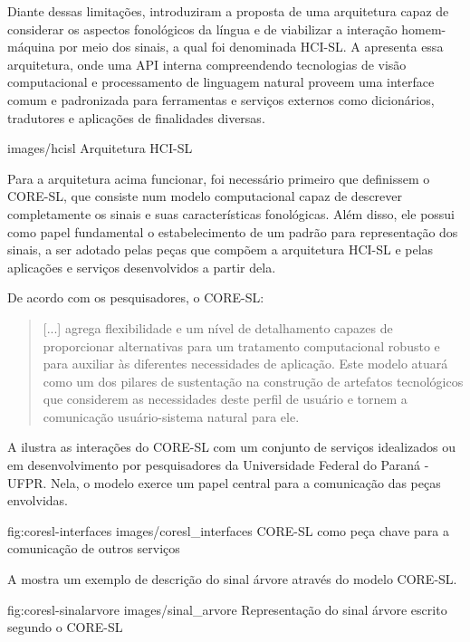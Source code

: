 Diante dessas limitações, \textcite{antunes-hcisl-2011} introduziram a proposta de uma arquitetura capaz de considerar os aspectos fonológicos da língua e de viabilizar a interação homem-máquina por meio dos sinais, a qual foi denominada HCI-SL. A  apresenta essa arquitetura, onde uma API interna compreendendo tecnologias de visão computacional e processamento de linguagem natural proveem uma interface comum e padronizada para ferramentas e serviços externos como dicionários, tradutores e aplicações de finalidades diversas.

    {images/hcisl}
    {Arquitetura HCI-SL \cite{antunes-hcisl-2011}}

Para a arquitetura acima funcionar, foi necessário primeiro que \textcite{antunes-hcisl-2011} definissem o CORE-SL, que consiste num modelo computacional capaz de descrever completamente os sinais e suas características fonológicas. Além disso, ele possui como papel fundamental o estabelecimento de um padrão para representação dos sinais, a ser adotado pelas peças que compõem a arquitetura HCI-SL e pelas aplicações e serviços desenvolvidos a partir dela.

De acordo com os pesquisadores, o CORE-SL:

\begin{quote}
[...] agrega flexibilidade e um nível de detalhamento capazes de proporcionar alternativas para um tratamento computacional robusto e para auxiliar às diferentes necessidades de aplicação. Este modelo atuará como um dos pilares de sustentação na construção de artefatos tecnológicos que considerem as necessidades deste perfil de usuário e tornem a comunicação usuário-sistema natural para ele. \cite{antunes-2011}
\end{quote}

 A  ilustra as interações do CORE-SL com um conjunto de serviços idealizados ou em desenvolvimento por pesquisadores da Universidade Federal do Paraná - UFPR. Nela, o modelo exerce um papel central para a comunicação das peças envolvidas.

\image
    {fig:coresl-interfaces}
    {images/coresl_interfaces}
    {CORE-SL como peça chave para a comunicação de outros serviços}

A  mostra um exemplo de descrição do sinal árvore através do modelo CORE-SL.

\image
    {fig:coresl-sinalarvore}
    {images/sinal_arvore}
    {Representação do sinal árvore escrito segundo o CORE-SL}
    

